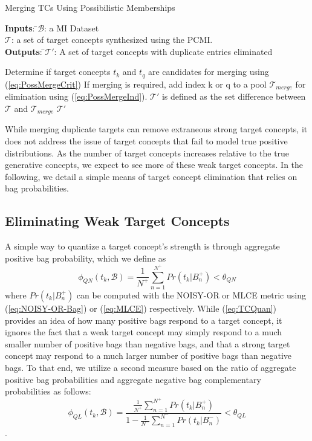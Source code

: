 \documentclass[12pt,dvips]{report}
\numberwithin{equation}{section}
\begin{document}
\begin{algorithm}
  \caption{Merging TCs Using Possibilistic Memberships}
  \label{alg:possmerge}
  {\begin{tabbing}
  \textbf{Inputs}: \=$\mathcal{B}$: a MI Dataset\\
   \>$\mathcal{T}$: a set of target concepts synthesized using the PCMI.\\
   \textbf{Outputs}: \=$\mathcal{T}'$: A set of target concepts with duplicate entries eliminated\\
   \end{tabbing}}
  \begin{algorithmic}
     		\STATE Determine if target concepts $t_k$ and $t_q$ are candidates for merging using (\ref{eq:PossMergeCrit})
		\STATE If merging is required, add index k or q to a pool $\mathcal{T}_{merge}$ for elimination using (\ref{eq:PossMergeInd}).
	\ENDFOR
     \ENDFOR
    \STATE $\mathcal{T}'$ is defined as the set difference between $\mathcal{T}$ and $\mathcal{T}_{merge}$ 
    \RETURN $\mathcal{T}'$
  \end{algorithmic}
\end{algorithm}

While merging duplicate targets can remove extraneous strong target concepts, it does not address the issue of target concepts that fail to model true positive distributions.  As the number of target concepts increases relative to the true generative concepts, we expect to see more of these weak target concepts.  In the following, we detail a simple means of target concept elimination that relies on bag probabilities.

\subsection{Eliminating Weak Target Concepts} \label{subsec:selweak}
A simple way to quantize a target concept's strength is through aggregate positive bag probability, which we define as
\begin{equation} \label{eq:TCQuan}
\phi_{QN}(t_k,\mathcal{B})=\frac{1}{N^+}{\sum^{N^+}_{n=1}Pr(t_{k}\vert B_{n}^{+})} < \theta_{QN}
\end{equation} where $Pr(t_{k}\vert B_{n}^{+})$ can be computed with the NOISY-OR or MLCE metric using (\ref{eq:NOISY-OR-Bag}) or (\ref{eq:MLCE}) respectively.
While (\ref{eq:TCQuan}) provides an idea of how many positive bags respond to a target concept, it ignores the fact that a weak target concept may simply respond to a much smaller number of positive bags than negative bags, and that a strong target concept may respond to a much larger number of positive bags than negative bags. To that end, we utilize a second measure based on the ratio of aggregate positive bag probabilities and aggregate negative bag complementary probabilities as follows:
\begin{equation} \label{eq:TCQual}
\phi_{QL}(t_k,\mathcal{B})=\frac{\frac{1}{N^+}\sum^{N^+}_{n=1}Pr(t_{k}\vert B_{n}^{+})}{1-\frac{1}{N^-}\sum^{N^-}_{n=1}Pr(t_{k}\vert B_{n}^{-})} < \theta_{QL}
\end{equation}.  
\end{document}
